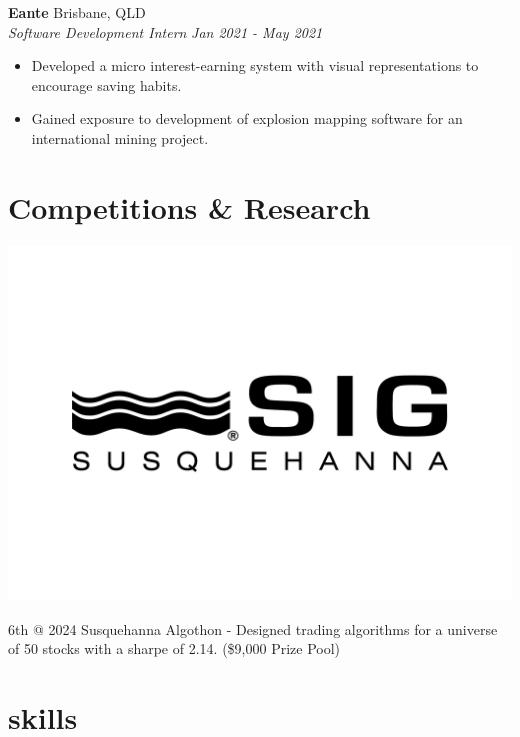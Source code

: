 \documentclass[12pt]{article}
\begin{document}
\textbf{Eante} \hfill {Brisbane, QLD} \\
\indent \textit{\color{subtextgray}Software Development Intern} \hfill \textit{\color{subtextgray}Jan 2021 - May 2021}
\begin{itemize}[noitemsep, topsep=0em, left=0.8em]
  \item Developed a micro interest-earning system with visual representations to encourage saving habits.
  \item	Gained exposure to development of explosion mapping software for an international mining project.
\end{itemize}

\vspace{1em}

\section{Competitions \& Research}

\noindent
\begin{minipage}{0.15\textwidth}
    \includegraphics[width=\linewidth]{icons/SIG-icon}
\end{minipage}%
\begin{minipage}{0.8\textwidth}
    6th @ 2024 Susquehanna Algothon - Designed trading algorithms for a universe of 50 stocks with a sharpe of 2.14. (\$9,000 Prize Pool)
\end{minipage}

\vspace{1em}

\section{skills}
\end{document}
